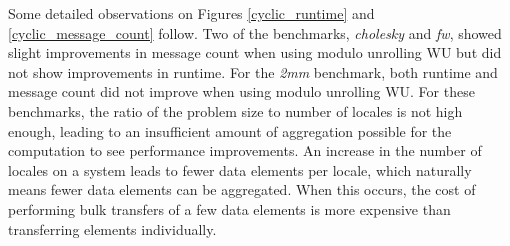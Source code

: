 Some detailed observations on Figures \ref{cyclic_runtime} and \ref{cyclic_message_count} follow. Two of the benchmarks, \textit{cholesky} and \textit{fw}, showed slight improvements in message count when using modulo unrolling WU but did not show improvements in runtime. For the \textit{2mm} benchmark, both runtime and message count did not improve when using modulo unrolling WU. For these benchmarks, the ratio of the problem size to number of locales is not high enough, leading to an insufficient amount of aggregation possible for the computation to see performance improvements. An increase in the number of locales on a system leads to fewer data elements per locale, which naturally means fewer data elements can be aggregated. When this occurs, the cost of performing bulk transfers of a few data elements is more expensive than transferring elements individually. 

